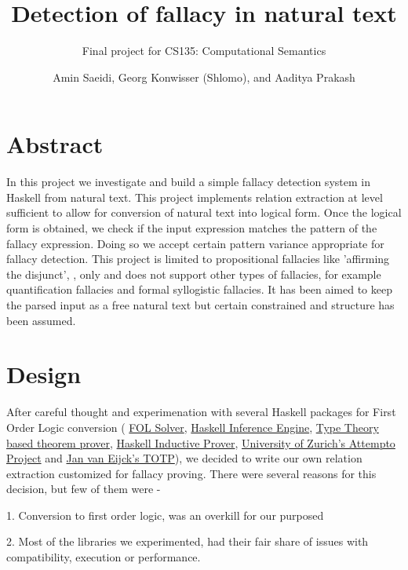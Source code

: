 \documentclass[14pt, english]{article}
\date{Amin Saeidi, Georg Konwisser (Shlomo), and Aaditya Prakash}
\begin{document}
\title{Detection of fallacy in natural text}

\author{Final project for CS135: Computational Semantics}

\maketitle

\section{Abstract}

In this project we investigate and build a simple fallacy detection
system in Haskell from natural text. This project implements relation
extraction at level sufficient to allow for conversion of natural
text into logical form. Once the logical form is obtained, we check if the input expression matches the pattern of the fallacy expression. Doing so we accept certain pattern variance appropriate for fallacy detection.
This project is limited to propositional fallacies like 'affirming the disjunct', , only and
does not support other types of fallacies, for example quantification
fallacies and formal syllogistic fallacies. It has been aimed to keep
the parsed input as a free natural text but certain constrained and
structure has been assumed.


\section{Design}

After careful thought and experimenation with several Haskell packages
for First Order Logic conversion ( \href{https://github.com/traeger/fol-solver}{FOL Solver},
\href{https://github.com/marcosccm/enki}{Haskell Inference Engine},
\href{https://github.com/edwinb/Ivor}{Type Theory based theorem prover},
\href{https://github.com/danr/hip}{Haskell Inductive Prover}, \href{http://attempto.ifi.uzh.ch/site/}{University of Zurich's Attempto Project}
and \href{http://homepages.cwi.nl/~jve/courses/12/haskellroad/TOTP.pdf}{Jan van Eijck's TOTP}),
we decided to write our own relation extraction customized for fallacy
proving. There were several reasons for this decision, but few of
them were -

1. Conversion to first order logic, was an overkill for our purposed

2. Most of the libraries we experimented, had their fair share of
issues with compatibility, execution or performance.
\end{document}
